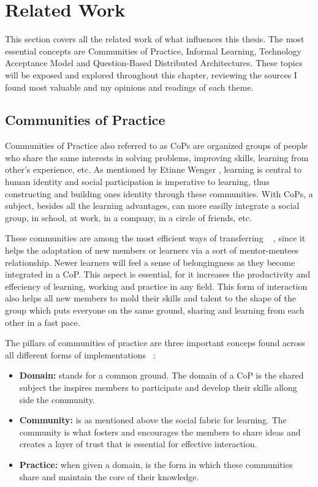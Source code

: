 \chapter{Related Work}
\label{cha:relatedwork}

This section covers all the related work of what influences this thesis.
The most essential concepts are Communities of Practice, Informal Learning, 
Technology Acceptance Model 
and Question-Based Distributed Architectures.
These topics will be exposed and explored throughout this chapter, 
reviewing the sources I found most valuable and my opinions and 
readings of each theme.


\section{Communities of Practice}

Communities of Practice also referred to as CoPs are organized groups of people 
who share the same interests in solving problems, improving skills, learning 
from other's experience, etc. As mentioned by Etinne Wenger \cite{wenger_2002},
learning is central to human identity and social participation is imperative to
learning, thus constructing and building ones identity through these communities.
With CoPs, a subject, besides all the learning advantages, can more easilly integrate
a social group, in school, at work, in a company, in a circle of friends, etc.

These communities are among the most efficient ways of transferring 
~ \cite{goffin_koners_2011}, since it helps the 
adaptation of new members or learners via a sort of mentor-mentees relationship.
Newer learners will feel a sense of belongingness as they become integrated in 
a CoP. This aspect is essential, for it increases the productivity and effeciency 
of learning, working and practice in any field. This form of interaction also 
helps all new members to mold their skills and talent to the shape of the group which
puts everyone on the same ground, sharing and learning from each other in a fast
pace. ~\cite{wengercop}

The pillars of communities of practice are three important conceps found across all
different forms of implementations ~\cite{placeofcopinkm}:

\begin{itemize}
    \item \textbf{Domain:} stands for a common ground. The domain of a CoP is the 
        shared subject the inspires members to participate and develop their skills
        allong side the community.
    \item \textbf{Community:} is as mentioned above the social fabric for learning.
        The community is what fosters and encourages the members to share ideas 
        and creates a layer of trust that is essential for effective interaction.
    \item \textbf{Practice:} when given a domain, is the form in which these 
        communities share and maintain the core of their knowledge.
\end{itemize}

